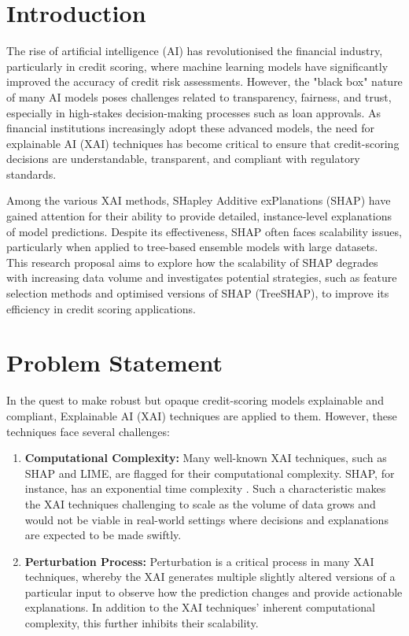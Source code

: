 \documentclass[12pt,a4paper]{article}
\begin{document}
\section{Introduction}
\vspace{-1em}
The rise of artificial intelligence (AI) has revolutionised the financial industry, particularly in credit scoring, where machine learning models have significantly improved the accuracy of credit risk assessments. However, the "black box" nature of many AI models poses challenges related to transparency, fairness, and trust, especially in high-stakes decision-making processes such as loan approvals. As financial institutions increasingly adopt these advanced models, the need for explainable AI (XAI) techniques has become critical to ensure that credit-scoring decisions are understandable, transparent, and compliant with regulatory standards.

Among the various XAI methods, SHapley Additive exPlanations (SHAP) have gained attention for their ability to provide detailed, instance-level explanations of model predictions. Despite its effectiveness, SHAP often faces scalability issues, particularly when applied to tree-based ensemble models with large datasets. This research proposal aims to explore how the scalability of SHAP degrades with increasing data volume and investigates potential strategies, such as feature selection methods and optimised versions of SHAP (TreeSHAP), to improve its efficiency in credit scoring applications.





\section{Problem Statement}
\vspace{-1em}
In the quest to make robust but opaque credit-scoring models explainable and compliant, Explainable AI (XAI) techniques are applied to them. 
However, these techniques face several challenges:
\begin{enumerate}
    \item \textbf{Computational Complexity:} Many well-known XAI techniques, such as SHAP and LIME, are flagged for their computational complexity. SHAP, for instance, has an exponential time complexity \citep{misheva2021explainable}. Such a characteristic makes the XAI techniques challenging to scale as the volume of data grows and would not be viable in real-world settings where decisions and explanations are expected to be made swiftly.
    \item \textbf{Perturbation Process:} Perturbation is a critical process in many XAI techniques, whereby the XAI generates multiple slightly altered versions of a particular input to observe how the prediction changes and provide actionable explanations. In addition to the XAI techniques’ inherent computational complexity, this further inhibits their scalability.
\end{enumerate}
\end{document}
